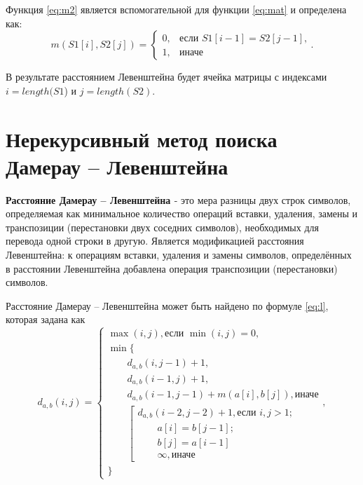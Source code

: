 Функция \ref{eq:m2} является вспомогательной для функции \ref{eq:mat} и  определена как:
\begin{equation}
\label{eq:m2}
m(S1[i], S2[j]) = \begin{cases}
0, &\text{если $S1[i - 1] = S2[j - 1]$,}\\
1, &\text{иначе}
\end{cases}.
\end{equation}
 
В результате расстоянием Левенштейна будет ячейка матрицы с индексами $i = length(S1$) и $j = length(S2)$.


\section{Нерекурсивный метод поиска Дамерау -- Левенштейна}

\textbf{Расстояние Дамерау -- Левенштейна \cite{Dameray_Levenshtein}} - это мера разницы двух строк символов, определяемая как минимальное количество операций вставки, удаления, замены и транспозиции (перестановки двух соседних символов), необходимых для перевода одной строки в другую. Является модификацией расстояния Левенштейна: к операциям вставки, удаления и замены символов, определённых в расстоянии Левенштейна добавлена операция транспозиции (перестановки) символов.

Расстояние Дамерау -- Левенштейна может быть найдено по формуле \ref{eq:l}, которая задана как
\begin{equation}
	\label{eq:l}
	d_{a,b}(i, j) = \begin{cases}
		\max(i, j), \text{если }\min(i, j) = 0,\\
		\min \lbrace \\
			\qquad d_{a,b}(i, j-1) + 1,\\
			\qquad d_{a,b}(i-1, j) + 1,\\
			\qquad d_{a,b}(i-1, j-1) + m(a[i], b[j]), \text{иначе}\\
			\qquad \left[ \begin{array}{cc}d_{a,b}(i-2, j-2) + 1, \text{если }i,j > 1;\\
			\qquad \text{}a[i] = b[j-1]; \\
			\qquad \text{}b[j] = a[i-1]\\
			\qquad \infty,  \text{иначе}\end{array}\right.\\
		\rbrace
		\end{cases},
\end{equation}

